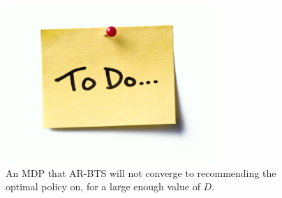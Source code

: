         \begin{figure}
            \centering
            \includegraphics[width=0.7\textwidth]{figures/todo.jpg}
            \caption{An MDP that AR-BTS will not converge to recommending the optimal policy on, for a large enough value of $D$.}
            \label{fig:ar_gen_mdp}
        \end{figure}

